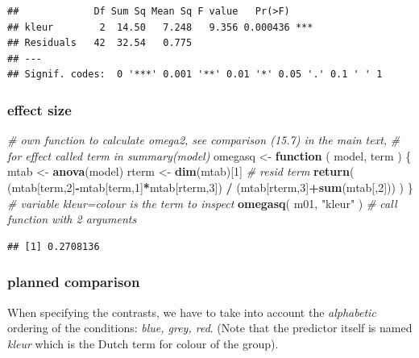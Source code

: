 \documentclass[
]{book}
\newenvironment{Shaded}{\begin{snugshade}}{\end{snugshade}}
\newcommand{\CommentTok}[1]{\textcolor[rgb]{0.56,0.35,0.01}{\textit{#1}}}
\newcommand{\ControlFlowTok}[1]{\textcolor[rgb]{0.13,0.29,0.53}{\textbf{#1}}}
\newcommand{\DecValTok}[1]{\textcolor[rgb]{0.00,0.00,0.81}{#1}}
\newcommand{\FunctionTok}[1]{\textcolor[rgb]{0.13,0.29,0.53}{\textbf{#1}}}
\newcommand{\NormalTok}[1]{#1}
\newcommand{\OtherTok}[1]{\textcolor[rgb]{0.56,0.35,0.01}{#1}}
\newcommand{\SpecialCharTok}[1]{\textcolor[rgb]{0.81,0.36,0.00}{\textbf{#1}}}
\newcommand{\StringTok}[1]{\textcolor[rgb]{0.31,0.60,0.02}{#1}}
\begin{document}
\begin{verbatim}
##             Df Sum Sq Mean Sq F value   Pr(>F)    
## kleur        2  14.50   7.248   9.356 0.000436 ***
## Residuals   42  32.54   0.775                     
## ---
## Signif. codes:  0 '***' 0.001 '**' 0.01 '*' 0.05 '.' 0.1 ' ' 1
\end{verbatim}

\hypertarget{R:omega-square}{%
\subsubsection{effect size}\label{R:omega-square}}

\begin{Shaded}
\begin{Highlighting}[]
\CommentTok{\# own function to calculate omega2, see comparison (15.7) in the main text,}
\CommentTok{\# for effect called \textasciigrave{}term\textasciigrave{} in summary(\textasciigrave{}model\textasciigrave{})}
\NormalTok{omegasq }\OtherTok{\textless{}{-}} \ControlFlowTok{function}\NormalTok{ ( model, term ) \{   }
\NormalTok{     mtab }\OtherTok{\textless{}{-}} \FunctionTok{anova}\NormalTok{(model)}
\NormalTok{     rterm }\OtherTok{\textless{}{-}} \FunctionTok{dim}\NormalTok{(mtab)[}\DecValTok{1}\NormalTok{] }\CommentTok{\# resid term}
     \FunctionTok{return}\NormalTok{( (mtab[term,}\DecValTok{2}\NormalTok{]}\SpecialCharTok{{-}}\NormalTok{mtab[term,}\DecValTok{1}\NormalTok{]}\SpecialCharTok{*}\NormalTok{mtab[rterm,}\DecValTok{3}\NormalTok{]) }\SpecialCharTok{/} 
\NormalTok{             (mtab[rterm,}\DecValTok{3}\NormalTok{]}\SpecialCharTok{+}\FunctionTok{sum}\NormalTok{(mtab[,}\DecValTok{2}\NormalTok{])) )}
\NormalTok{\}}
\CommentTok{\# variable kleur=colour is the term to inspect}
\FunctionTok{omegasq}\NormalTok{( m01, }\StringTok{"kleur"}\NormalTok{ ) }\CommentTok{\# call function with 2 arguments}
\end{Highlighting}
\end{Shaded}

\begin{verbatim}
## [1] 0.2708136
\end{verbatim}

\hypertarget{planned-comparison-2}{%
\subsubsection{planned comparison}\label{planned-comparison-2}}

When specifying the contrasts, we have to take into account the
\emph{alphabetic} ordering of the conditions: \emph{blue, grey, red}.
(Note that the predictor itself is named \emph{kleur} which is the Dutch term for colour of the group).
\end{document}
